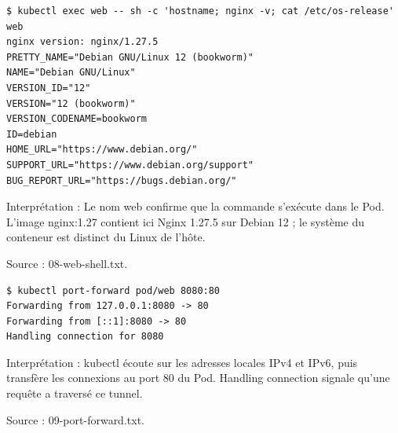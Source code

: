 \documentclass[11pt,a4paper]{article}
\begin{document}
\par\medskip\noindent\begin{minipage}{\linewidth}
\par\vspace{4pt}\noindent\begin{minipage}{\linewidth}
\begin{Verbatim}[breaklines=true,breakanywhere=true,fontsize=\footnotesize,frame=single,framesep=8pt,rulecolor=\color{teal}]
$ kubectl exec web -- sh -c 'hostname; nginx -v; cat /etc/os-release'
web
nginx version: nginx/1.27.5
PRETTY_NAME="Debian GNU/Linux 12 (bookworm)"
NAME="Debian GNU/Linux"
VERSION_ID="12"
VERSION="12 (bookworm)"
VERSION_CODENAME=bookworm
ID=debian
HOME_URL="https://www.debian.org/"
SUPPORT_URL="https://www.debian.org/support"
BUG_REPORT_URL="https://bugs.debian.org/"
\end{Verbatim}
\end{minipage}\par\vspace{6pt}

Interprétation : Le nom web confirme que la commande s'exécute dans le Pod. L'image nginx:1.27 contient ici Nginx 1.27.5 sur Debian 12 ; le système du conteneur est distinct du Linux de l'hôte.

{\footnotesize\color{teal} Source : 08-web-shell.txt.\par}
\end{minipage}\par\medskip

\par\medskip\noindent\begin{minipage}{\linewidth}
\par\vspace{4pt}\noindent\begin{minipage}{\linewidth}
\begin{Verbatim}[breaklines=true,breakanywhere=true,fontsize=\footnotesize,frame=single,framesep=8pt,rulecolor=\color{teal}]
$ kubectl port-forward pod/web 8080:80
Forwarding from 127.0.0.1:8080 -> 80
Forwarding from [::1]:8080 -> 80
Handling connection for 8080
\end{Verbatim}
\end{minipage}\par\vspace{6pt}

Interprétation : kubectl écoute sur les adresses locales IPv4 et IPv6, puis transfère les connexions au port 80 du Pod. Handling connection signale qu'une requête a traversé ce tunnel.

{\footnotesize\color{teal} Source : 09-port-forward.txt.\par}
\end{minipage}\par\medskip
\end{document}
